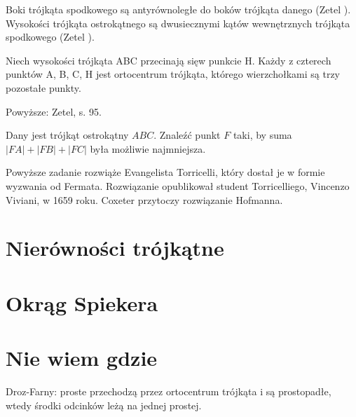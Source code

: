 Boki trójkąta spodkowego są antyrównoległe do boków trójkąta danego (Zetel \cite[s. 89]{zetel_2020}).
Wysokości trójkąta ostrokątnego są dwusiecznymi kątów wewnętrznych trójkąta spodkowego (Zetel \cite[s. 89]{zetel_2020}).

\begin{proposition}
	Niech wysokości trójkąta ABC przecinają sięw punkcie H.
	Każdy z czterech punktów A, B, C, H jest ortocentrum trójkąta, którego wierzchołkami są trzy pozostałe punkty.
\end{proposition}

Powyższe: Zetel, s. 95.

\begin{problem}
	\label{punkt_fermata}
	Dany jest trójkąt ostrokątny $ABC$.
	Znaleźć punkt $F$ taki, by suma $|FA| + |FB| + |FC|$ była możliwie najmniejsza.
%
\end{problem}


Powyższe zadanie rozwiąże Evangelista Torricelli, który dostał je w formie wyzwania od Fermata.
%
Rozwiązanie opublikował student Torricelliego, Vincenzo Viviani, w 1659 roku.
Coxeter \cite[s. 37]{coxeter_1967} przytoczy rozwiązanie Hofmanna. %

\section{Nierówności trójkątne}


\section{Okrąg Spiekera}


\section{Nie wiem gdzie}

Droz-Farny: proste przechodzą przez ortocentrum trójkąta i są prostopadłe, wtedy środki odcinków leżą na jednej prostej. %

